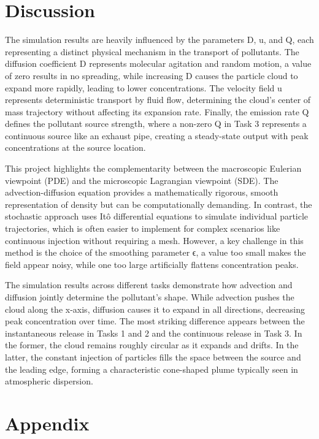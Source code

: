 \documentclass[11pt]{article}
\begin{document}
    \section{Discussion}\label{discussion}

    The simulation results are heavily influenced by the parameters D, u,
and Q, each representing a distinct physical mechanism in the transport
of pollutants. The diffusion coefficient D represents molecular
agitation and random motion, a value of zero results in no spreading,
while increasing D causes the particle cloud to expand more rapidly,
leading to lower concentrations. The velocity field u represents
deterministic transport by fluid flow, determining the cloud's center of
mass trajectory without affecting its expansion rate. Finally, the
emission rate Q defines the pollutant source strength, where a non-zero
Q in Task 3 represents a continuous source like an exhaust pipe,
creating a steady-state output with peak concentrations at the source
location.

This project highlights the complementarity between the macroscopic
Eulerian viewpoint (PDE) and the microscopic Lagrangian viewpoint (SDE).
The advection-diffusion equation provides a mathematically rigorous,
smooth representation of density but can be computationally demanding.
In contrast, the stochastic approach uses Itô differential equations to
simulate individual particle trajectories, which is often easier to
implement for complex scenarios like continuous injection without
requiring a mesh. However, a key challenge in this method is the choice
of the smoothing parameter ϵ, a value too small makes the field appear
noisy, while one too large artificially flattens concentration peaks.

The simulation results across different tasks demonstrate how advection
and diffusion jointly determine the pollutant's shape. While advection
pushes the cloud along the x-axis, diffusion causes it to expand in all
directions, decreasing peak concentration over time. The most striking
difference appears between the instantaneous release in Tasks 1 and 2
and the continuous release in Task 3. In the former, the cloud remains
roughly circular as it expands and drifts. In the latter, the constant
injection of particles fills the space between the source and the
leading edge, forming a characteristic cone-shaped plume typically seen
in atmospheric dispersion.

    \section{Appendix}\label{appendix}
\end{document}

